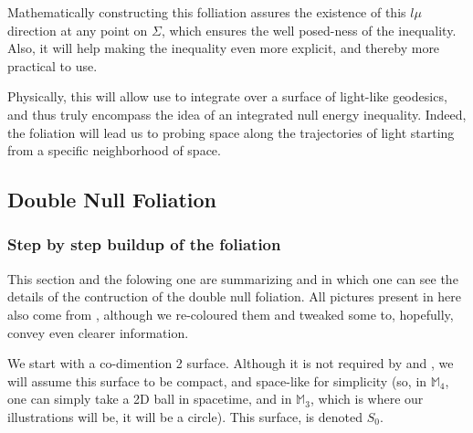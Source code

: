 \documentclass[a4paper,11pt]{article}
\numberwithin{equation}{section}
\theoremstyle{definition}
\begin{document}
Mathematically constructing this folliation assures the existence of this $l\mu$ direction at any point on $\Sigma$, which ensures the well posed-ness of the inequality. Also, it will help making the inequality even more explicit, and thereby more practical to use.

Physically, this will allow use to integrate over a surface of light-like geodesics, and thus truly encompass the idea of an integrated null energy inequality. Indeed, the foliation will lead us to probing space along the trajectories of light starting from a specific neighborhood of space.



\subsection{Double Null Foliation}
\subsubsection{Step by step buildup of the foliation}
This section and the folowing one are summarizing \cite{Chris} and \cite{Art} in which one can see the details of the contruction of the double null foliation. All pictures present in here also come from \cite{Art}, although we re-coloured them and tweaked some to, hopefully, convey even clearer information.

We start with a co-dimention 2 surface. Although it is not required by \cite{Chris} and \cite{Art}, we will assume this surface to be compact, and space-like for simplicity (so, in $\mathbb{M}_4$, one can simply take a 2D ball in spacetime, and in $\mathbb{M}_3$, which is where our illustrations will be, it will be a circle). This surface, is denoted $S_0$.
\end{document}

